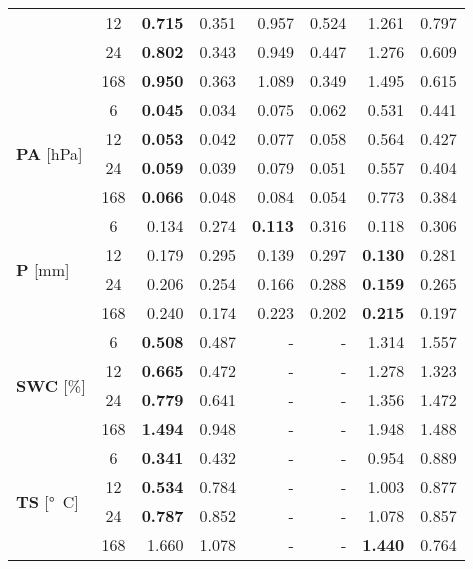 \begin{table}
\begin{tabular}{p{2.1cm}c|rr|rr|rr}
 & 12 & \bfseries 0.715 & 0.351 & 0.957 & 0.524 & 1.261 & 0.797 \\
 & 24 & \bfseries 0.802 & 0.343 & 0.949 & 0.447 & 1.276 & 0.609 \\
 & 168 & \bfseries 0.950 & 0.363 & 1.089 & 0.349 & 1.495 & 0.615 \\
\cline{1-8}
\multirow[c]{4}{*}{\parbox{2.1cm}{\textbf{PA} [\si{hPa}]}} & 6 & \bfseries 0.045 & 0.034 & 0.075 & 0.062 & 0.531 & 0.441 \\
 & 12 & \bfseries 0.053 & 0.042 & 0.077 & 0.058 & 0.564 & 0.427 \\
 & 24 & \bfseries 0.059 & 0.039 & 0.079 & 0.051 & 0.557 & 0.404 \\
 & 168 & \bfseries 0.066 & 0.048 & 0.084 & 0.054 & 0.773 & 0.384 \\
\cline{1-8}
\multirow[c]{4}{*}{\parbox{2.1cm}{\textbf{P} [\si{mm}]}} & 6 & 0.134 & 0.274 & \bfseries 0.113 & 0.316 & 0.118 & 0.306 \\
 & 12 & 0.179 & 0.295 & 0.139 & 0.297 & \bfseries 0.130 & 0.281 \\
 & 24 & 0.206 & 0.254 & 0.166 & 0.288 & \bfseries 0.159 & 0.265 \\
 & 168 & 0.240 & 0.174 & 0.223 & 0.202 & \bfseries 0.215 & 0.197 \\
\cline{1-8}
\multirow[c]{4}{*}{\parbox{2.1cm}{\textbf{SWC} [\si{\%}]}} & 6 & \bfseries 0.508 & 0.487 & - & - & 1.314 & 1.557 \\
 & 12 & \bfseries 0.665 & 0.472 & - & - & 1.278 & 1.323 \\
 & 24 & \bfseries 0.779 & 0.641 & - & - & 1.356 & 1.472 \\
 & 168 & \bfseries 1.494 & 0.948 & - & - & 1.948 & 1.488 \\
\cline{1-8}
\multirow[c]{4}{*}{\parbox{2.1cm}{\textbf{TS} [\si{°C}]}} & 6 & \bfseries 0.341 & 0.432 & - & - & 0.954 & 0.889 \\
 & 12 & \bfseries 0.534 & 0.784 & - & - & 1.003 & 0.877 \\
 & 24 & \bfseries 0.787 & 0.852 & - & - & 1.078 & 0.857 \\
 & 168 & 1.660 & 1.078 & - & - & \bfseries 1.440 & 0.764 \\
\cline{1-8}
\bottomrule
\end{tabular}
\end{table}
